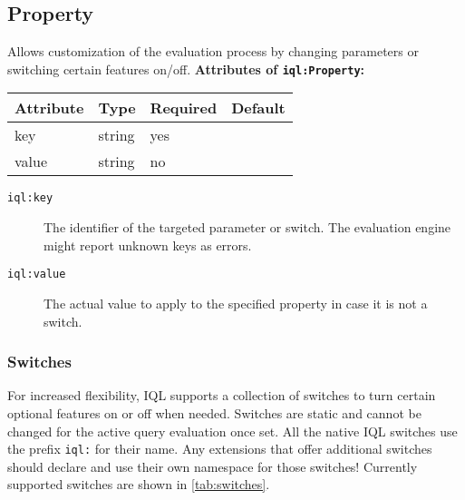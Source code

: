 \documentclass[11pt]{article}
\newcommand{\iql}{IQL\xspace}
\newcommand{\iqlns}{iql:}
\newcommand{\iqlType}[1]{\texttt{\iqlns#1}}
\newcommand{\desc}[1]{\noindent#1\newline\medskip}
\newenvironment{attributes}[1]{
\noindent\textbf{Attributes of #1:}\newline\medskip
\begin{tabular}{|p{0.28\textwidth}|p{0.16\textwidth}|p{0.17\textwidth}|p{0.15\textwidth}|}
	\hline
	\textbf{Attribute} & \textbf{Type} & \textbf{Required} & \textbf{Default} \\ 
	\hline
	\hline
}{
\end{tabular}
}
\newcommand{\attribute}[4]{
	#1 & #2 & #3 & #4 \\
	\hline
}
\begin{document}
\subsection{Property}
\label{sec:json-ld-property}
\desc{Allows customization of the evaluation process by changing parameters or switching certain features on/off.}
\begin{attributes}{\iqlType{Property}}
	\attribute{key}{string}{yes}{}
	\attribute{value}{string}{no}{}
\end{attributes}
\begin{description}
	\item[\iqlType{key}] The identifier of the targeted parameter or switch. The evaluation engine might report unknown keys as errors.
	\item[\iqlType{value}] The actual value to apply to the specified property in case it is not a switch.
\end{description}

\subsubsection{Switches}
\label{sec:json-ld-switches}
For increased flexibility, \iql supports a collection of switches to turn certain optional features on or off when needed. Switches are static and cannot be changed for the active query evaluation once set. All the native \iql switches use the prefix \texttt{iql:} for their name. Any extensions that offer additional switches should declare and use their own namespace for those switches! Currently supported switches are shown in \cref{tab:switches}. %
\end{document}
